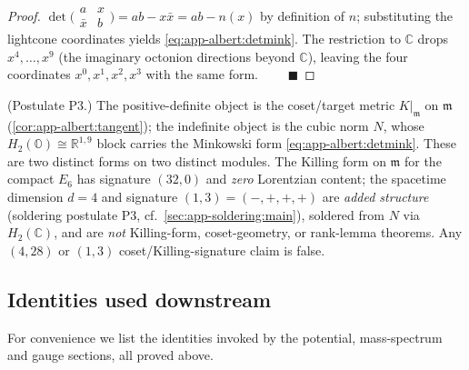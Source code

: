 \begin{proof}
$\det\!\bigl(\begin{smallmatrix}a&x\\\bar x&b\end{smallmatrix}\bigr)
=ab-x\bar x=ab-n(x)$ by definition of $n$; substituting the lightcone
coordinates yields \eqref{eq:app-albert:detmink}. The restriction to
$\mathbb C$ drops $x^4,\dots,x^9$ (the imaginary octonion directions beyond
$\mathbb C$), leaving the four coordinates $x^0,x^1,x^2,x^3$ with the same form.
$\qquad\blacksquare$
\end{proof}

\begin{remark}\label{rmk:app-albert:signature}
\textup{(Postulate P3.)}
The positive-definite object is the coset/target metric $K|_{\mathfrak m}$ on
$\mathfrak m$ (\autoref{cor:app-albert:tangent}); the indefinite object is the
cubic norm $N$, whose $H_2(\mathbb O)\cong\mathbb R^{1,9}$ block carries the
Minkowski form \eqref{eq:app-albert:detmink}. These are two distinct forms on two
distinct modules. The Killing form on $\mathfrak m$ for the compact $E_6$ has
signature $(32,0)$ and \emph{zero} Lorentzian content; the spacetime dimension
$d=4$ and signature $(1,3)=(-,+,+,+)$ are \emph{added structure} (soldering
postulate P3, cf.\ \autoref{sec:app-soldering:main}), soldered from $N$ via
$H_2(\mathbb C)$, and are \emph{not} Killing-form, coset-geometry, or rank-lemma
theorems. Any $(4,28)$ or $(1,3)$ coset/Killing-signature claim is false.
\end{remark}

\subsection{Identities used downstream}
\label{sec:app-albert:identities}

For convenience we list the identities invoked by the potential, mass-spectrum and
gauge sections, all proved above.

